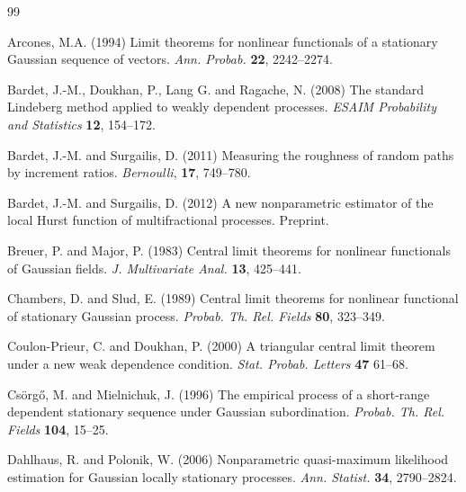 \documentclass[10pt]{article}
\begin{document}
\begin{thebibliography}{99}

 Arcones, M.A. (1994) Limit theorems for nonlinear
functionals of a stationary Gaussian sequence of vectors.
{\em Ann. Probab.} {\bf 22}, 2242--2274.

 Bardet, J.-M., Doukhan, P., Lang G. and Ragache, N. (2008)
The standard Lindeberg method applied to weakly dependent processes. {\em ESAIM Probability
and Statistics} {\bf 12}, 154--172.

 Bardet, J.-M. and Surgailis, D. (2011) Measuring the roughness of random paths by increment ratios. {\em Bernoulli}, {\bf 17}, 749--780.


 Bardet, J.-M. and Surgailis, D. (2012) A new nonparametric estimator of the local Hurst function
of multifractional processes. Preprint.


 Breuer, P. and Major, P. (1983) Central limit theorems
for nonlinear functionals of Gaussian fields. {\em J.  Multivariate
Anal.} {\bf 13}, 425--441.

 Chambers, D. and Slud, E. (1989) Central limit theorems for
nonlinear functional of stationary Gaussian process. {\em Probab.
Th. Rel. Fields} {\bf 80}, 323--349.

 Coulon-Prieur, C. and Doukhan, P. (2000)
A triangular central limit theorem under a new weak dependence condition. {\em Stat. Probab. Letters} {\bf 47} 61--68.


 Cs\"org{\H o}, M. and Mielnichuk, J. (1996) The empirical process of a short-range dependent stationary
sequence under Gaussian subordination. {\em Probab. Th. Rel. Fields} {\bf 104},  15--25.


 Dahlhaus, R. and Polonik, W. (2006) Nonparametric quasi-maximum likelihood estimation for Gaussian locally stationary processes.
{\em Ann. Statist.} {\bf 34}, 2790--2824.


\end{thebibliography}
\end{document}
